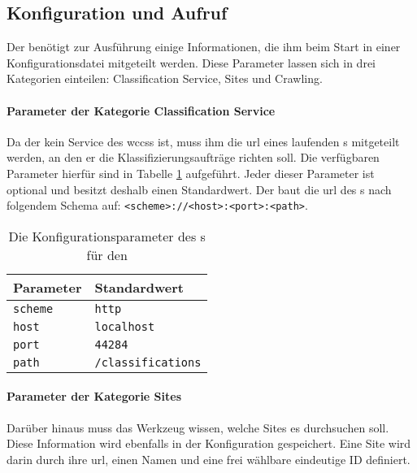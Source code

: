 \subsection{Konfiguration und Aufruf}
    Der {\wordpressCrawler} benötigt zur Ausführung einige Informationen,
    die ihm beim Start in einer Konfigurationsdatei mitgeteilt werden.
    Diese Parameter lassen sich in drei Kategorien einteilen:
    Classification Service, Sites und Crawling.

    \paragraph{Parameter der Kategorie Classification Service}
    Da der {\wordpressCrawler} kein Service des \glspl{wccs} ist,
    muss ihm die \gls{url} eines laufenden {\classificationService}s mitgeteilt werden,
    an den er die Klassifizierungsaufträge richten soll.
    Die verfügbaren Parameter hierfür sind in Tabelle \ref{table:crawlerClassificationServiceParameter} aufgeführt.
    Jeder dieser Parameter ist optional und besitzt deshalb einen Standardwert.
    Der {\wordpressCrawler} baut die \gls{url} des {\classificationService}s nach
    folgendem Schema auf: \texttt{<scheme>://<host>:<port>:<path>}.

    \begin{table}[htb]
        \centering
        \begin{tabular}{|l|l|}
            \hline
            \textbf{Parameter} & \textbf{Standardwert}\\
            \hline
            \texttt{scheme} & \texttt{http} \\
            \hline
            \texttt{host} & \texttt{localhost} \\
            \hline
            \texttt{port} & \texttt{44284} \\
            \hline
            \texttt{path} & \texttt{/classifications} \\
            \hline
            \end{tabular}
        \caption{Die Konfigurationsparameter des {\wordpressCrawler}s für den {\classificationService}}
        \label{table:crawlerClassificationServiceParameter}
    \end{table}

    \paragraph{Parameter der Kategorie Sites}
    Darüber hinaus muss das Werkzeug wissen,
    welche {\wordpress} Sites es durchsuchen soll.
    Diese Information wird ebenfalls in der Konfiguration gespeichert.
    Eine {\wordpress} Site wird darin durch
    ihre \gls{url}, einen Namen und eine frei wählbare eindeutige ID definiert.

